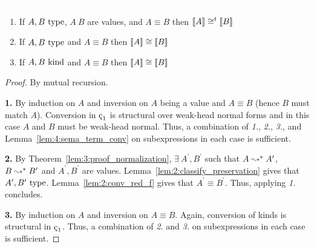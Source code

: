 \begin{lemma}
    \label{lem:4:sema_type_conv}
    \textcolor{white}{\_}
    \begin{enumerate}
        \item If $A, B~\textnormal{type}$, $A\ B$ are values, and $A \equiv B$ then $\llbracket A \rrbracket \cong^t \llbracket B \rrbracket$
        \item If $A, B~\textnormal{type}$ and $A \equiv B$ then $\llbracket A \rrbracket \cong \llbracket B \rrbracket$
        \item If $A, B~\textnormal{kind}$ and $A \equiv B$ then $\llbracket A \rrbracket \cong \llbracket B \rrbracket$
    \end{enumerate}
\end{lemma}
\begin{proof}
    By mutual recursion.

    \noindent \textbf{1.}
    By induction on $A$ and inversion on $A$ being a value and $A \equiv B$ (hence $B$ must match $A$).
    Conversion in $\oldced$ is structural over weak-head normal forms and in this case $A$ and $B$ must be weak-head normal.
    Thus, a combination of \textit{1.}, \textit{2.}, \textit{3.}, and Lemma~\ref{lem:4:sema_term_conv} on subexpressions in each case is sufficient.

    \noindent \textbf{2.}
    By Theorem~\ref{lem:3:proof_normalization}, $\exists\ A^\prime, B^\prime$ such that $A \leadsto^* A^\prime$, $B \leadsto^* B^\prime$ and $A^\prime, B^\prime$ are values.
    Lemma~\ref{lem:2:classify_preservation} gives that $A^\prime, B^\prime~\textnormal{type}$.
    Lemma~\ref{lem:2:conv_red_f} gives that $A^\prime \equiv B^\prime$.
    Thus, applying \textit{1.} concludes.

    \noindent \textbf{3.}
    By induction on $A$ and inversion on $A \equiv B$.
    Again, conversion of kinds is structural in $\oldced$.
    Thus, a combination of \textit{2.} and \textit{3.} on subexpressions in each case is sufficient.
\end{proof}

